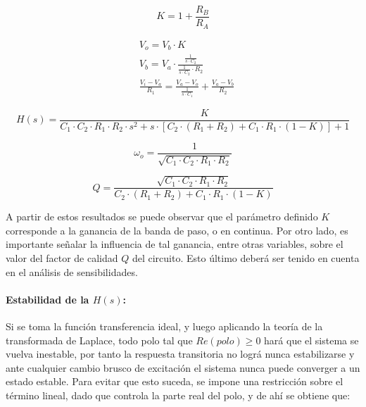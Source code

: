 \begin{equation}
    K = 1 + \frac{R_B}{R_A}
    \label{eq:sallen_key_k}
\end{equation}

\begin{align*}
    & V_o = V_b \cdot K \\
    & V_b = V_a \cdot \frac{\frac{1}{s \cdot C_2}}{\frac{1}{s \cdot C_2} \cdot R_2} \\
    & \frac{V_i - V_a}{R_1} = \frac{V_a - V_o}{\frac{1}{s \cdot C_1}} + \frac{V_a - V_b}{R_2}
\end{align*}

\begin{equation}
    H(s) = \frac{K}{C_1 \cdot C_2 \cdot R_1 \cdot R_2 \cdot s^{2} + s \cdot \left[ C_2 \cdot (R_1 + R_2) + C_1 \cdot R_1 \cdot (1 - K) \right] + 1}
    \label{eq:sallen_key_h}
\end{equation}

\begin{equation}
    \omega_o = \frac{1}{\sqrt{C_1 \cdot C_2 \cdot R_1 \cdot R_2}}
    \label{eq:sallen_key_wo}
\end{equation}

\begin{equation}
    Q = \frac{\sqrt{C_1 \cdot C_2 \cdot R_1 \cdot R_2}}{C_2 \cdot (R_1 + R_2) + C_1 \cdot R_1 \cdot (1 - K)}
    \label{eq:sallen_key_q}
\end{equation}

A partir de estos resultados se puede observar que el par\'ametro definido $K$ corresponde a la ganancia de la banda de paso, o en continua. Por otro lado, es importante
se\~nalar la influencia de tal ganancia, entre otras variables, sobre el valor del factor de calidad $Q$ del circuito. Esto \'ultimo deber\'a ser tenido en cuenta en el an\'alisis de sensibilidades.

\paragraph{Estabilidad de la $H(s)$:} Si se toma la funci\'on transferencia ideal, y luego aplicando la teor\'ia de la transformada de Laplace, todo polo tal que $Re(polo) \geq 0$ har\'a que el sistema se vuelva inestable,
por tanto la respuesta transitoria no logr\'a nunca estabilizarse y ante cualquier cambio brusco de excitaci\'on el sistema nunca puede converger a un estado estable. Para evitar que esto suceda, se impone una restricci\'on sobre el t\'ermino lineal,
dado que controla la parte real del polo, y de ah\'i se obtiene que:

